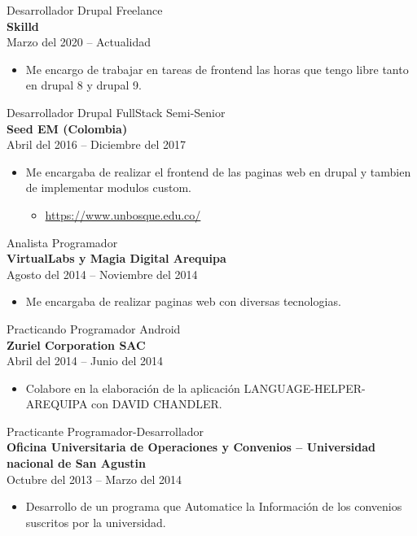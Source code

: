 \documentclass[letterpaper]{twentysecondcv} %
\begin{document}
{\Large Desarrollador Drupal Freelance}\\
{\large \bf Skilld}\\
{Marzo del 2020 -- Actualidad}
\begin{itemize}
\item Me encargo de trabajar en tareas de frontend las horas que tengo libre tanto en drupal 8 y drupal 9.\\
\end{itemize}

{\Large Desarrollador Drupal FullStack Semi-Senior}\\
{\large \bf Seed EM (Colombia)}\\
{Abril del 2016 -- Diciembre del 2017}
\begin{itemize}
\item Me encargaba de realizar el frontend de las paginas web en drupal y tambien de implementar modulos custom. 
  \begin{itemize}
	\item {\url{https://www.unbosque.edu.co/}}\\
  \end{itemize}
\end{itemize}


{\Large Analista Programador}\\
{\large \bf VirtualLabs y Magia Digital Arequipa}\\
{Agosto del 2014 -- Noviembre del 2014}
\begin{itemize}
\item Me encargaba de realizar paginas web con diversas tecnologias. \\
\end{itemize}


{\Large Practicando Programador Android}\\
{\large \bf Zuriel Corporation SAC}\\
{Abril del 2014 -- Junio del 2014}
\begin{itemize}
\item Colabore en la elaboración de la aplicación LANGUAGE-HELPER-AREQUIPA con DAVID CHANDLER.\\
\end{itemize}


{\Large Practicante Programador-Desarrollador}\\
{\large \bf Oficina Universitaria de Operaciones y Convenios – Universidad nacional de San Agustin}\\
{Octubre del 2013 -- Marzo del 2014}
\begin{itemize}
\item Desarrollo de un programa que Automatice la Información de los convenios suscritos por la universidad.\\  
\end{itemize}
\end{document}
